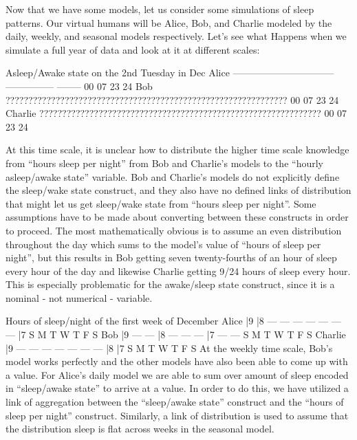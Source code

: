 \documentclass[runningheads,a4paper]{llncs}
\begin{document}
Now that we have some models, let us consider some simulations of sleep patterns. Our virtual humans will be Alice, Bob, and Charlie modeled by the daily, weekly, and seasonal models respectively. Let’s see what Happens when we simulate a full year of data and look at it at different scales:

 Asleep/Awake state on the 2nd Tuesday in Dec 
Alice
              --------------------------------        
---------------                                --------
    00            07                               23     24
Bob
??????????????????????????????????????????????????????????????
    00            07                               23     24
Charlie
??????????????????????????????????????????????????????????????
    00            07                               23     24

At this time scale, it is unclear how to distribute the higher time scale knowledge from “hours sleep per night” from Bob and Charlie’s models to the “hourly asleep/awake state” variable. Bob and Charlie's models do not explicitly define the sleep/wake state construct, and they also have no defined links of distribution that might let us get sleep/wake state from “hours sleep per night”.
Some assumptions have to be made about converting between these constructs in order to proceed. The most mathematically obvious is to assume an even distribution throughout the day which sums to the model’s value of “hours of sleep per night”, but this results in Bob getting seven twenty-fourths of an hour of sleep every hour of the day and likewise Charlie getting 9/24 hours of sleep every hour. This is especially problematic for the awake/sleep state construct, since it is a nominal - not numerical - variable.

 Hours of sleep/night of the first week of December 
Alice
|9                            
|8 ---  ---  ---  ---  ---  ---  ---     
|7           
   S    M    T    W    T    F    S    
Bob
|9 ---                           ---
|8      ---       ---       ---     
|7           ---       ---
   S    M    T    W    T    F    S    
Charlie
|9 ---  ---  ---  ---  ---  ---  ---                                
|8  
|7           
   S    M    T    W    T    F    S  
At the weekly time scale, Bob’s model works perfectly and the other models have also been able to come up with a value. For Alice’s daily model we are able to sum over amount of sleep encoded in “sleep/awake state” to arrive at a value. In order to do this, we have utilized a link of aggregation between the “sleep/awake state” construct and the “hours of sleep per night” construct. Similarly, a link of distribution is used to assume that the distribution sleep is flat across weeks in the seasonal model.
\end{document}

